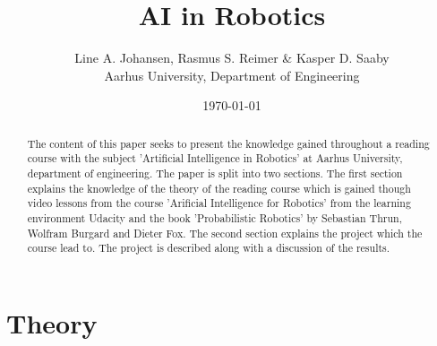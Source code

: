 

\title{
	\textbf{AI in Robotics}
}

\author{
	Line A. Johansen, Rasmus S. Reimer \& Kasper D. Saaby\\
	Aarhus University, Department of Engineering \\
}
\date{\today}




\maketitle

\tableofcontents


\begin{abstract}
The content of this paper seeks to present the knowledge gained throughout a reading course with the subject 'Artificial Intelligence in Robotics' at Aarhus University, department of engineering. The paper is split into two sections. The first section explains the knowledge of the theory of the reading course which is gained though video lessons from the course 'Arificial Intelligence for Robotics' from the learning environment Udacity and the book 'Probabilistic Robotics' by Sebastian Thrun, Wolfram Burgard and Dieter Fox. The second section explains the project which the course lead to. The project is described along with a discussion of the results.
\end{abstract}


\chapter{Theory}








